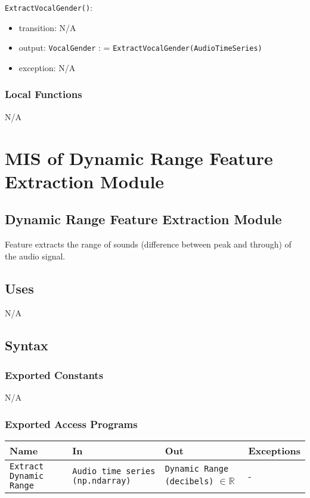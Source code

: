 \documentclass[12pt, titlepage]{article}
\begin{document}
\noindent \texttt{ExtractVocalGender()}:
\begin{itemize}
\item transition: N/A
\item output: \texttt{Vocal\textunderscore Gender} : = \texttt{ExtractVocalGender(Audio\textunderscore Time\textunderscore Series)}
\item exception: N/A
\end{itemize}

\subsubsection{Local Functions}
N/A

\section{MIS of Dynamic Range Feature Extraction Module} 

\subsection{Dynamic Range Feature Extraction Module}
Feature extracts the range of sounds (difference between peak and through) of the audio signal.

\subsection{Uses}
N/A

\subsection{Syntax}

\subsubsection{Exported Constants}
N/A

\subsubsection{Exported Access Programs}

\begin{center}
\begin{tabular}{p{2cm} p{4cm} p{4cm} p{2cm}}
\hline
\textbf{Name} & \textbf{In} & \textbf{Out} & \textbf{Exceptions}\\
\hline%
\texttt{Extract Dynamic Range} &\texttt{Audio time series (np.ndarray)} &\texttt{Dynamic Range (decibels)} $\in \mathbb{R}$ &-\\
\hline
\end{tabular}
\end{center}
\end{document}
